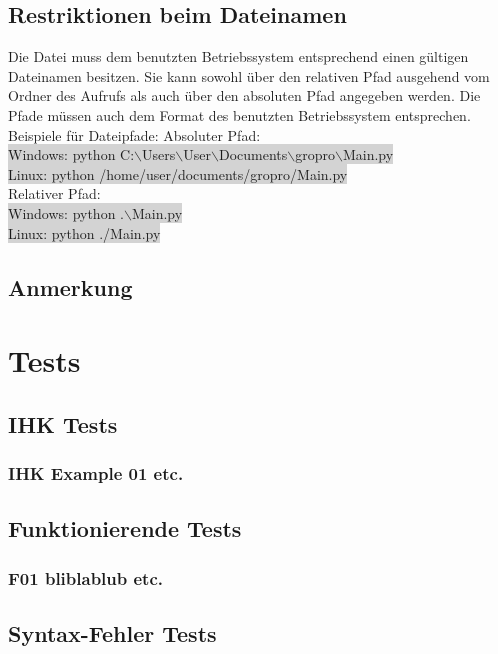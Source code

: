 \documentclass[a4paper,11pt]{article}
\begin{document}
{\subsection{Restriktionen beim Dateinamen}
Die Datei muss dem benutzten Betriebssystem entsprechend einen g\"ultigen Dateinamen besitzen.
Sie kann sowohl \"uber den relativen Pfad ausgehend vom Ordner des Aufrufs als auch \"uber den absoluten Pfad angegeben werden.
Die Pfade m\"ussen auch dem Format des benutzten Betriebssystem entsprechen.
Beispiele f\"ur Dateipfade:
\vspace{3mm}
Absoluter Pfad:\\
\colorbox{lightgray}{Windows: python \glqq C:$\backslash$Users$\backslash$User$\backslash$Documents$\backslash$gropro$\backslash$Main.py\grqq{}}\\
\colorbox{lightgray}{Linux: python /home/user/documents/gropro/Main.py}\\
Relativer Pfad:\\
\colorbox{lightgray}{Windows: python .$\backslash$Main.py}\\
\colorbox{lightgray}{Linux: python ./Main.py}


\subsection{Anmerkung}

\section{Tests}

\subsection{IHK Tests}

\subsubsection{IHK Example 01 etc.}

\subsection{Funktionierende Tests}

\subsubsection{F01 bliblablub etc.}

\subsection{Syntax-Fehler Tests}

}
\end{document}
